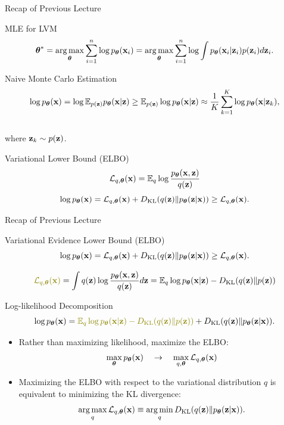 \documentclass{beamer}
\begin{document}
\begin{frame}
	\titlepage
	\resetonslide
\end{frame}
\begin{frame}{Recap of Previous Lecture}
	\begin{block}{MLE for LVM}
		\vspace{-0.3cm}
		\[
			\boldsymbol{\theta}^* = \operatorname*{arg\,max}_{\boldsymbol{\theta}} \sum_{i=1}^n \log p_{\boldsymbol{\theta}}(\mathbf{x}_i) = \operatorname*{arg\,max}_{\boldsymbol{\theta}}  \sum_{i=1}^n \log \int p_{\boldsymbol{\theta}}(\mathbf{x}_i| \mathbf{z}_i) p(\mathbf{z}_i) d\mathbf{z}_i.
		\]
		\vspace{-0.3cm}
	\end{block}
	\begin{block}{Naive Monte Carlo Estimation}
		\vspace{-0.7cm}
		\[
			\log p_{\boldsymbol{\theta}}(\mathbf{x}) = \log \mathbb{E}_{p(\mathbf{z})} p_{\boldsymbol{\theta}}(\mathbf{x} | \mathbf{z}) \geq \mathbb{E}_{p(\mathbf{z})} \log p_{\boldsymbol{\theta}}(\mathbf{x} | \mathbf{z}) \approx \frac{1}{K} \sum_{k=1}^{K} \log p_{\boldsymbol{\theta}}(\mathbf{x} | \mathbf{z}_k),
		\]
		\vspace{-0.5cm} \\
		where $\mathbf{z}_k \sim p(\mathbf{z})$. 
	\end{block}
	\begin{block}{Variational Lower Bound (ELBO)}
		\vspace{-0.3cm}
		\[
			\mathcal{L}_{q, \boldsymbol{\theta}}(\mathbf{x}) = \mathbb{E}_{q} \log \frac{p_{\boldsymbol{\theta}}(\mathbf{x}, \mathbf{z})}{q(\mathbf{z})}
		\]
		\vspace{-0.3cm}
		\[
			\log p_{\boldsymbol{\theta}}(\mathbf{x}) = \mathcal{L}_{q, \boldsymbol{\theta}}(\mathbf{x}) + D_\mathrm{KL}(q(\mathbf{z}) \| p_{\boldsymbol{\theta}}(\mathbf{z}|\mathbf{x})) \geq \mathcal{L}_{q, \boldsymbol{\theta}}(\mathbf{x}).
		\]
	\end{block}
\end{frame}
\begin{frame}{Recap of Previous Lecture}
	\begin{block}{Variational Evidence Lower Bound (ELBO)}
		\vspace{-0.3cm}
		\[
			\log p_{\boldsymbol{\theta}}(\mathbf{x}) = \mathcal{L}_{q, \boldsymbol{\theta}}(\mathbf{x}) + D_\mathrm{KL}(q(\mathbf{z}) \| p_{\boldsymbol{\theta}}(\mathbf{z}|\mathbf{x})) \geq \mathcal{L}_{q, \boldsymbol{\theta}}(\mathbf{x}).
		\]
	\end{block}

	\vspace{-0.5cm}
	\[
	 	{\color{olive}\cL_{q, \btheta}(\bx)} = \int q(\bz) \log \frac{\pt(\bx, \bz)}{q(\bz)}d\bz = \bbE_{q} \log \pt(\bx | \bz) - \KL (q(\bz) \| p(\bz))
	\]
	\vspace{-0.3cm}
	\begin{block}{Log-likelihood Decomposition}
		\vspace{-0.5cm}
		\[
	 		\log \pt(\bx) = {\color{olive}\bbE_{q} \log \pt(\bx | \bz) - \KL (q(\bz) \| p(\bz))} + \KL(q(\bz) \| \pt(\bz|\bx)).
		\]
	\end{block}
	\begin{itemize}
		\item Rather than maximizing likelihood, maximize the ELBO:
		\[
			\max_{\boldsymbol{\theta}} p_{\boldsymbol{\theta}}(\mathbf{x}) \quad \rightarrow \quad \max_{q, \boldsymbol{\theta}} \mathcal{L}_{q, \boldsymbol{\theta}}(\mathbf{x})
		\]
		\item Maximizing the ELBO with respect to the variational distribution $q$ is equivalent to minimizing the KL divergence:
		\[
			\operatorname*{arg\,max}_q \mathcal{L}_{q, \boldsymbol{\theta}}(\mathbf{x}) \equiv \operatorname*{arg\,min}_q D_\mathrm{KL}(q(\mathbf{z}) \| p_{\boldsymbol{\theta}}(\mathbf{z}|\mathbf{x})).
		\]
  	\end{itemize}
\end{frame}
\end{document}

